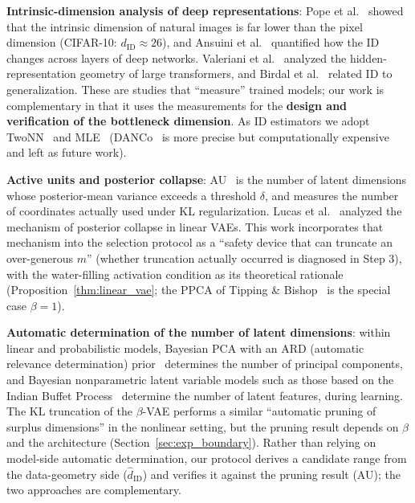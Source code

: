 \documentclass[make,article,submit,pdftex,moreauthors]{Definitions/mdpi}
\newcommand{\dID}{d_{\mathrm{ID}}}
\newcommand{\hatdID}{\hat{d}_{\mathrm{ID}}}
\begin{document}
\textbf{Intrinsic-dimension analysis of deep representations}:
Pope et al.~\cite{pope2021intrinsic} showed that the intrinsic dimension of
natural images is far lower than the pixel dimension (CIFAR-10:
$\dID \approx 26$), and Ansuini et al.~\cite{ansuini2019intrinsic}
quantified how the ID changes across layers of deep networks.
Valeriani et al.~\cite{valeriani2023geometry} analyzed the hidden-representation
geometry of large transformers, and Birdal et
al.~\cite{birdal2021intrinsic} related ID to generalization.
These are studies that ``measure'' trained models; our work is complementary
in that it uses the measurements for the \textbf{design and verification of
the bottleneck dimension}.
As ID estimators we adopt TwoNN~\cite{facco2017twonn} and
MLE~\cite{levina2005mle} (DANCo~\cite{ceruti2014danco} is more precise but
computationally expensive and left as future work).

\textbf{Active units and posterior collapse}:
AU~\cite{higgins2017betavae,lucas2019elbo} is the number of latent
dimensions whose posterior-mean variance exceeds a threshold $\delta$, and
measures the number of coordinates actually used under KL regularization.
Lucas et al.~\cite{lucas2019elbo} analyzed the mechanism of posterior
collapse in linear VAEs.
This work incorporates that mechanism into the selection protocol as a
``safety device that can truncate an over-generous $m$'' (whether truncation
actually occurred is diagnosed in Step 3), with the water-filling activation
condition as its theoretical rationale
(Proposition~\ref{thm:linear_vae}; the PPCA of Tipping \&
Bishop~\cite{tippingbishop1999ppca} is the special case $\beta = 1$).

\textbf{Automatic determination of the number of latent dimensions}:
within linear and probabilistic models, Bayesian PCA with an ARD (automatic
relevance determination) prior~\cite{bishop1999bayesian} determines the
number of principal components, and Bayesian nonparametric latent variable
models such as those based on the Indian Buffet
Process~\cite{ghahramani2005infinite} determine the number of latent
features, during learning.
The KL truncation of the $\beta$-VAE performs a similar ``automatic pruning
of surplus dimensions'' in the nonlinear setting, but the pruning result
depends on $\beta$ and the architecture (Section~\ref{sec:exp_boundary}).
Rather than relying on model-side automatic determination, our protocol
derives a candidate range from the data-geometry side ($\hatdID$) and
verifies it against the pruning result (AU); the two approaches are
complementary.
\end{document}
